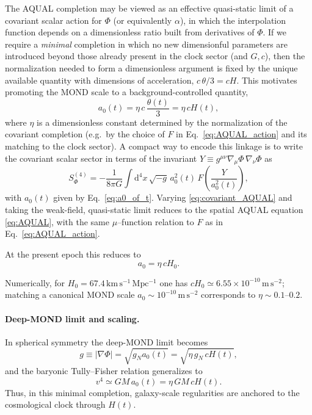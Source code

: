 \documentclass[12pt]{article}
\newcommand{\dd}{\mathrm{d}}
\newcommand{\alphaReg}{\alpha}
\begin{document}
The AQUAL completion may be viewed as an effective quasi-static limit of a covariant scalar action for $\Phi$ (or equivalently $\alphaReg$), in which the interpolation function depends on a dimensionless ratio built from derivatives of $\Phi$.
If we require a \emph{minimal} completion in which no new dimensionful parameters are introduced beyond those already present in the clock sector (and $G,c$), then the normalization needed to form a dimensionless argument is fixed by the unique available quantity with dimensions of acceleration,
$c\,\theta/3=cH$.
This motivates promoting the MOND scale to a background-controlled quantity,
\begin{equation}
a_{0}(t)=\eta\,c\,\frac{\theta(t)}{3}=\eta\,cH(t),
\label{eq:a0_of_t}
\end{equation}
where $\eta$ is a dimensionless constant determined by the normalization of the covariant completion (e.g.\ by the choice of $F$ in Eq.~\eqref{eq:AQUAL_action} and its matching to the clock sector).
A compact way to encode this linkage is to write the covariant scalar sector in terms of the invariant
$Y\equiv g^{\mu\nu}\nabla_{\mu}\Phi\,\nabla_{\nu}\Phi$ as
\begin{equation}
S_{\Phi}^{(4)}=
-\frac{1}{8\pi G}\int \dd^{4}x\,\sqrt{-g}\,a_{0}^{2}(t)\,
F\!\left(\frac{Y}{a_{0}^{2}(t)}\right),
\label{eq:covariant_AQUAL}
\end{equation}
with $a_{0}(t)$ given by Eq.~\eqref{eq:a0_of_t}. Varying \eqref{eq:covariant_AQUAL} and taking the weak-field, quasi-static limit reduces to the spatial AQUAL equation \eqref{eq:AQUAL}, with the same $\mu$--function relation to $F$ as in Eq.~\eqref{eq:AQUAL_action}.

At the present epoch this reduces to
\begin{equation}
a_{0}=\eta\,cH_{0}.
\label{eq:a0cH0}
\end{equation}

Numerically, for $H_{0}=67.4\,\mathrm{km\,s^{-1}\,Mpc^{-1}}$ one has $cH_{0}\simeq 6.55\times 10^{-10}\,\mathrm{m\,s^{-2}}$; matching a canonical MOND scale $a_{0}\sim 10^{-10}\,\mathrm{m\,s^{-2}}$ corresponds to $\eta\sim 0.1$--$0.2$.


\paragraph{Deep-MOND limit and scaling.}
In spherical symmetry the deep-MOND limit becomes
\begin{equation}
g\equiv |\nabla\Phi|=\sqrt{g_{N}a_{0}(t)}=\sqrt{\eta\,g_{N}\,cH(t)},
\label{eq:deepmond_cH}
\end{equation}
and the baryonic Tully--Fisher relation generalizes to
\begin{equation}
v^{4}\simeq GM\,a_{0}(t)=\eta\,GM\,cH(t).
\label{eq:btf_cH}
\end{equation}
Thus, in this minimal completion, galaxy-scale regularities are anchored to the cosmological clock through $H(t)$.
\end{document}
